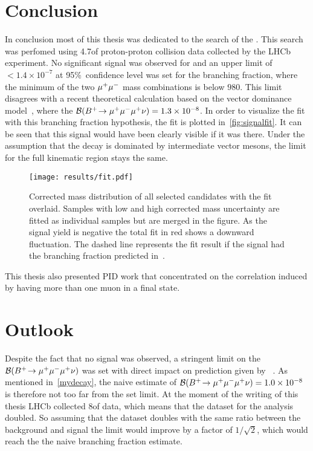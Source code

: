 \section{Conclusion}
In conclusion most of this thesis was dedicated to the search of the \Bmumumu.
This search was perfomed using 4.7\invfb of proton-proton collision data collected by the \gls{LHCb} experiment. No significant signal was observed for \Bmumumu and an upper limit of $< 1.4\times 10^{-7}$ at 95\%~confidence level was set for the branching fraction, where the minimum of the two ${\mu^+\mu^-}$ mass combinations is below $980$\mevcc. This limit disagrees with a recent theoretical calculation based on the vector dominance model~\cite{Danilina:2018uzr}, where the $\mathcal{B}({{{B}^+}}\!\rightarrow {\ensuremath{\mu^+\mu^-\mu^+}}\nu)=1.3\times 10^{-8}$. In order to visualize the fit with this branching fraction hypothesis, the fit is plotted in~\autoref{fig:signalfit}. It can be seen that this signal would have been clearly visible if it was there. Under the assumption that the decay is dominated by intermediate vector mesons, the limit for the full kinematic region stays the same.


\begin{figure}[t]
  \centering
  \texttt{[image: results/fit.pdf]}
  \caption{Corrected mass distribution of all selected \Bmumumu
    candidates with the fit overlaid. Samples with low and high
    corrected mass uncertainty are fitted as individual samples but
    are merged in the figure. As the signal yield is negative the total fit
    in red shows a downward fluctuation. The dashed line represents the fit
    result if the signal had the branching fraction predicted in~\cite{Danilina:2018uzr}.}
  \label{fig:signalfit}
\end{figure}


This thesis also presented \gls{PID} work that concentrated on the correlation induced by having more than one muon in a final state.


\section{Outlook}
Despite the fact that no signal was observed, a stringent limit on the $\mathcal{B}({{{B}^+}}\!\rightarrow {\ensuremath{\mu^+\mu^-\mu^+}}\nu)$ was set with direct impact on prediction given by ~\cite{Danilina:2018uzr}. As mentioned in~\autoref{mydecay}, the naive estimate of $\mathcal{B}({{{B}^+}}\!\rightarrow {\ensuremath{\mu^+\mu^-\mu^+}}\nu)=1.0\times 10^{-8}$ is therefore not too far from the set limit. At the moment of the writing of this thesis \gls{LHCb} collected 8\invfb of data, which means that the dataset for the analysis doubled. So assuming that the dataset doubles with the same ratio between the background and signal the limit would improve by a factor of $1/\sqrt{2}$, which would reach the the naive branching fraction estimate. 


